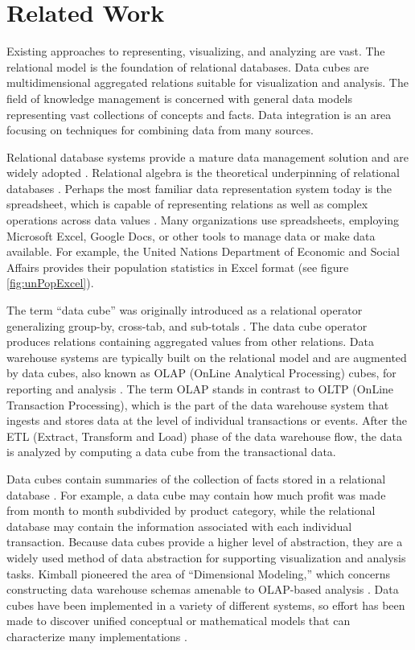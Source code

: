 \section{Related Work}
Existing approaches to representing, visualizing, and analyzing are vast. The relational model is the foundation of relational databases. Data cubes are multidimensional aggregated relations suitable for visualization and analysis. The field of knowledge management is concerned with general data models representing vast collections of concepts and facts. Data integration is an area focusing on techniques for combining data from many sources.

Relational database systems provide a mature data management solution and are widely adopted \cite{ramakrishnan2000database}. Relational algebra is the theoretical underpinning of relational databases \cite{clifford1985algebra}. Perhaps the most familiar data representation system today is the spreadsheet, which is capable of representing relations as well as complex operations across data values \cite{eick2000visualizing}. Many organizations use spreadsheets, employing Microsoft Excel, Google Docs, or other tools to manage data or make data available. For example, the United Nations Department of Economic and Social Affairs provides their population statistics in Excel format (see figure \ref{fig:unPopExcel}).

The term ``data cube'' was originally introduced as a relational operator generalizing group-by, cross-tab, and sub-totals \cite{gray1997data}. The data cube operator produces relations containing aggregated values from other relations. Data warehouse systems are typically built on the relational model and are augmented by data cubes, also known as OLAP (OnLine Analytical Processing) cubes, for reporting and analysis \cite{codd1993providing}. The term OLAP stands in contrast to OLTP (OnLine Transaction Processing), which is the part of the data warehouse system that ingests and stores data at the level of individual transactions or events. After the ETL (Extract, Transform and Load) phase of the data warehouse flow, the data is analyzed by computing a data cube from the transactional data.

Data cubes contain summaries of the collection of facts stored in a relational database \cite{chaudhuri1997overview}. For example, a data cube may contain how much profit was made from month to month subdivided by product category, while the relational database may contain the information associated with each individual transaction. Because data cubes provide a higher level of abstraction, they are a widely used method of data abstraction for supporting visualization and analysis tasks. Kimball pioneered the area of ``Dimensional Modeling,'' which concerns constructing data warehouse schemas amenable to OLAP-based analysis \cite{kimball1998data}. Data cubes have been implemented in a variety of different systems, so effort has been made to discover unified conceptual or mathematical models that can characterize many implementations \cite{datta1999cube, vassiliadis1999survey, vassiliadis1998modeling, li1996data, agrawal1997modeling, gyssens1997foundation, blaschka1998finding}.

